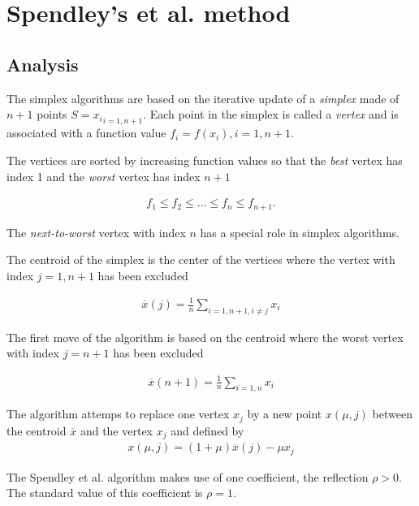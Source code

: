 \chapter{Spendley's et al. method}

\section{Analysis}

The simplex algorithms are based on the iterative update of 
a \emph{simplex} made of $n+1$ points $S={x_i}_{i=1,n+1}$. Each point 
in the simplex is called a \emph{vertex} and is associated with 
a function value $f_i=f(x_i), i=1,n+1$.

The vertices are sorted by increasing function values so that the 
\emph{best} vertex has index 1 and the \emph{worst} vertex 
has index $n+1$

\begin{eqnarray}
\label{sorted-vertices-fv}
f_1 \leq f_2 \leq \ldots \leq f_n \leq f_{n+1}.
\end{eqnarray}

The \emph{next-to-worst} vertex with index $n$ has a 
special role in simplex algorithms.

The centroid of the simplex is the center of the vertices
where the vertex with index $j=1,n+1$ has been 
excluded 

\begin{eqnarray}
\label{centroid-generalized}
\overline{x} (j) = \frac{1}{n} \sum_{i=1,n+1, i\neq j}x_i
\end{eqnarray}

The first move of the algorithm is based on the centroid 
where the worst vertex with index $j=n+1$ has been excluded 

\begin{eqnarray}
\label{centroid-worst}
\overline{x} (n+1) = \frac{1}{n} \sum_{i=1,n}x_i
\end{eqnarray}

The algorithm attemps to replace one vertex 
$x_j$ by a new point $x(\mu,j)$ between the centroid 
$\overline{x}$ and the vertex $x_j$ and defined by 
\begin{eqnarray}
\label{interpolate-generalized}
x(\mu,j) = (1+\mu)\overline{x}(j) - \mu x_j
\end{eqnarray}

The Spendley et al. \cite{Spendley1962} algorithm makes use
of one coefficient, the reflection $\rho>0$. The standard
value of this coefficient is $\rho=1$.

